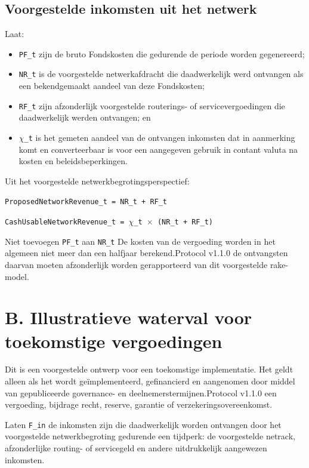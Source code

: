 \documentclass[11pt]{article}
\begin{document}
\subsection*{Voorgestelde inkomsten uit het netwerk}

Laat:

\begin{itemize}[leftmargin=*]
\item \texttt{PF\_t} zijn de bruto Fondskosten die gedurende de periode worden gegenereerd;
\item \texttt{NR\_t} is de voorgestelde netwerkafdracht die daadwerkelijk werd ontvangen als een bekendgemaakt aandeel van deze Fondskosten;
\item \texttt{RF\_t} zijn afzonderlijk voorgestelde routerings- of servicevergoedingen die daadwerkelijk werden ontvangen; en
\item \texttt{$\chi$\_t} is het gemeten aandeel van de ontvangen inkomsten dat in aanmerking komt en converteerbaar is voor een aangegeven gebruik in contant valuta na kosten en beleidsbeperkingen.
\end{itemize}
Uit het voorgestelde netwerkbegrotingsperspectief:

\texttt{ProposedNetworkRevenue\_t = NR\_t + RF\_t}

\texttt{CashUsableNetworkRevenue\_t = $\chi$\_t $\times$ (NR\_t + RF\_t)}

Niet toevoegen \texttt{PF\_t} aan \texttt{NR\_t} De kosten van de vergoeding worden in het algemeen niet meer dan een halfjaar berekend.Protocol v1.1.0 de ontvangsten daarvan moeten afzonderlijk worden gerapporteerd van dit voorgestelde rake-model.


\section*{B. Illustratieve waterval voor toekomstige vergoedingen}

Dit is een voorgestelde ontwerp voor een toekomstige implementatie. Het geldt alleen als het wordt geïmplementeerd, gefinancierd en aangenomen door middel van gepubliceerde governance- en deelnemerstermijnen.Protocol v1.1.0 een vergoeding, bijdrage recht, reserve, garantie of verzekeringsovereenkomst.

Laten \texttt{F\_in} de inkomsten zijn die daadwerkelijk worden ontvangen door het voorgestelde netwerkbegroting gedurende een tijdperk: de voorgestelde netrack, afzonderlijke routing- of servicegeld en andere uitdrukkelijk aangewezen inkomsten.
\end{document}
